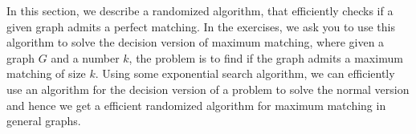 In this section, we describe a randomized algorithm, that efficiently checks if a given graph admits a perfect matching. In the exercises, we ask you to use this algorithm to solve the decision version of maximum matching, where given a graph $G$ and a number $k$, the problem is to find if the graph admits a maximum matching of size $k$. Using some exponential search algorithm, we can efficiently use an algorithm for the decision version of a problem to solve the normal version and hence we get a efficient randomized algorithm for maximum matching in general graphs.


